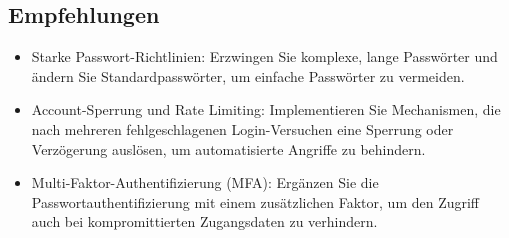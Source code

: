 \subsection*{Empfehlungen}
\begin{itemize}
    \item Starke Passwort-Richtlinien: Erzwingen Sie komplexe, lange Passwörter und ändern Sie Standardpasswörter, um einfache Passwörter zu vermeiden.
    \item Account-Sperrung und Rate Limiting: Implementieren Sie Mechanismen, die nach mehreren fehlgeschlagenen Login-Versuchen eine Sperrung oder Verzögerung auslösen, um automatisierte Angriffe zu behindern.
    \item Multi-Faktor-Authentifizierung (MFA): Ergänzen Sie die Passwortauthentifizierung mit einem zusätzlichen Faktor, um den Zugriff auch bei kompromittierten Zugangsdaten zu verhindern.
\end{itemize}